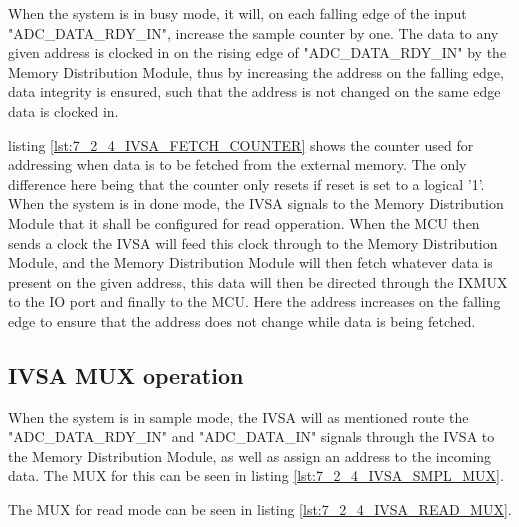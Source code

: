 When the system is in busy mode, it will, on each falling edge of the input "ADC\_DATA\_RDY\_IN", increase the sample counter by one. The data to any given address is clocked in on the rising edge of "ADC\_DATA\_RDY\_IN" by the Memory Distribution Module, thus by increasing the address on the falling edge, data integrity is ensured, such that the address is not changed on the same edge data is clocked in.



listing \ref{lst:7_2_4_IVSA_FETCH_COUNTER} shows the counter used for addressing when data is to be fetched from the external memory. The only difference here being that the counter only resets if reset is set to a logical '1'. When the system is in done mode, the IVSA signals to the Memory Distribution Module that it shall be configured for read opperation. When the MCU then sends a clock the IVSA will feed this clock through to the Memory Distribution Module, and the Memory Distribution Module will then fetch whatever data is present on the given address, this data will then be directed through the IXMUX to the IO port and finally to the MCU. Here the address increases on the falling edge to ensure that the address does not change while data is being fetched. 



\subsection*{IVSA MUX operation}
When the system is in sample mode, the IVSA will as mentioned route the "ADC\_DATA\_RDY\_IN" and "ADC\_DATA\_IN" signals through the IVSA to the Memory Distribution Module, as well as assign an address to the incoming data. The MUX for this can be seen in listing \ref{lst:7_2_4_IVSA_SMPL_MUX}. 



The MUX for read mode can be seen in listing \ref{lst:7_2_4_IVSA_READ_MUX}.


